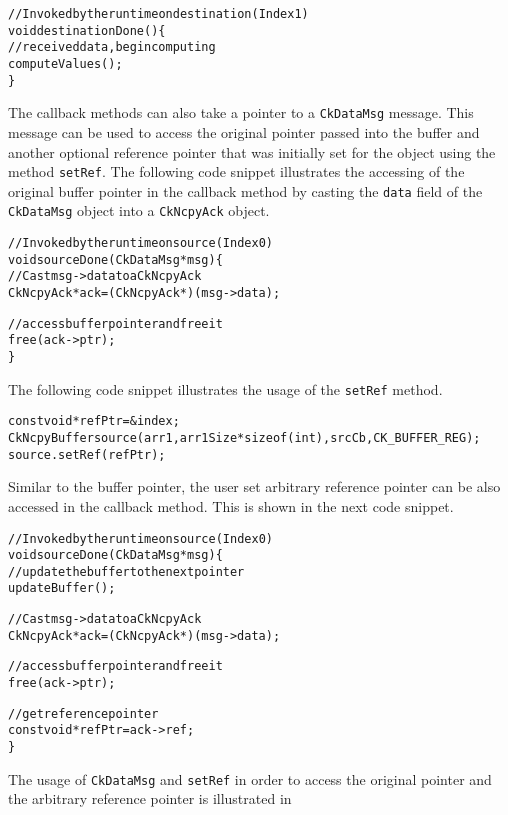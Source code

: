 \begin{alltt}
// Invoked by the runtime on destination (Index 1)
void destinationDone() \{
    // received data, begin computing
    computeValues();
\}
\end{alltt}

The callback methods can also take a pointer to a \texttt{CkDataMsg} message. This message can be
used to access the original pointer passed into the buffer and another optional reference pointer that was
initially set for the  object using the method \texttt{setRef}. The following code snippet
illustrates the accessing of the original buffer pointer in the callback method by casting the \texttt{data}
field of the \texttt{CkDataMsg} object into a \texttt{CkNcpyAck} object.

\begin{alltt}
// Invoked by the runtime on source (Index 0)
void sourceDone(CkDataMsg *msg) \{
    // Cast msg->data to a CkNcpyAck
    CkNcpyAck *ack = (CkNcpyAck *)(msg->data);

    // access buffer pointer and free it
    free(ack->ptr);
\}
\end{alltt}

The following code snippet illustrates the usage of the \texttt{setRef} method.

\begin{alltt}
const void *refPtr = &index;
CkNcpyBuffer source(arr1, arr1Size * sizeof(int), srcCb, CK_BUFFER_REG);
source.setRef(refPtr);
\end{alltt}

Similar to the buffer pointer, the user set arbitrary reference pointer can be also accessed in the
callback method. This is shown in the next code snippet.

\begin{alltt}
// Invoked by the runtime on source (Index 0)
void sourceDone(CkDataMsg *msg) \{
    // update the buffer to the next pointer
    updateBuffer();

    // Cast msg->data to a CkNcpyAck
    CkNcpyAck *ack = (CkNcpyAck *)(msg->data);

    // access buffer pointer and free it
    free(ack->ptr);

    // get reference pointer
    const void *refPtr = ack->ref;
\}
\end{alltt}

The usage of \texttt{CkDataMsg} and \texttt{setRef} in order to access the original
pointer and the arbitrary reference pointer is illustrated in

